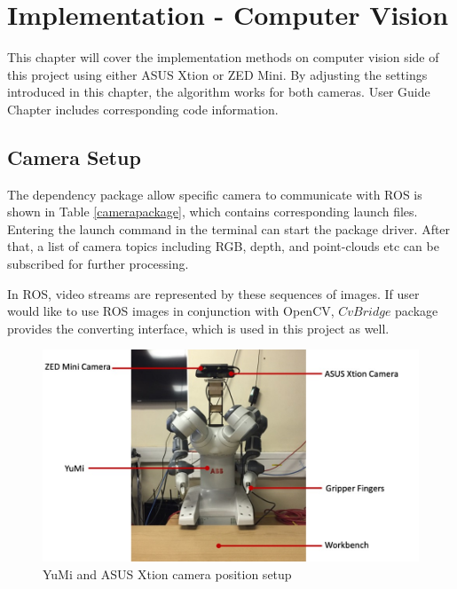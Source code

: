 \chapter{Implementation - Computer Vision}

This chapter will cover the implementation methods on computer vision side of this project using either ASUS Xtion or ZED Mini. By adjusting the settings introduced in this chapter, the algorithm works for both cameras. User Guide Chapter includes corresponding code information.

\section{Camera Setup}
The dependency package allow specific camera to communicate with ROS is shown in Table \ref{camerapackage}, which contains corresponding launch files. Entering the launch command in the terminal can start the package driver. After that, a list of camera topics including RGB, depth, and point-clouds etc can be subscribed for further processing. 

\begin{table}[H]
\centering
{}
\caption{The dependency packages and launch commands for Cameras}
\label{camerapackage}
\end{table}

In ROS, video streams are represented by these sequences of images. If user would like to use ROS images in conjunction with OpenCV, $CvBridge$ package provides the converting interface, which is used in this project as well.

\begin{figure}[H]
\centering
\includegraphics[width = \columnwidth]{Implementation/cv/yumicamera.jpg}
\caption{YuMi and ASUS Xtion camera position setup}
\label{5.1}
\end{figure}

